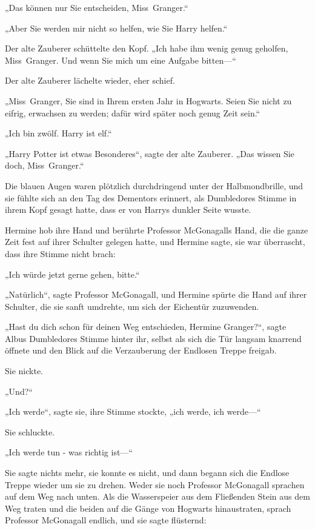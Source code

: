 {„Das können nur Sie entscheiden, Miss~Granger.“

„Aber Sie werden mir nicht so helfen, wie Sie Harry helfen.“

Der alte Zauberer schüttelte den Kopf. „Ich habe ihm wenig genug geholfen, Miss~Granger. Und wenn Sie mich um eine Aufgabe bitten—“

Der alte Zauberer lächelte wieder, eher schief.

„Miss~Granger, Sie sind in Ihrem ersten Jahr in Hogwarts. Seien Sie nicht zu eifrig, erwachsen zu werden; dafür wird später noch genug Zeit sein.“

„Ich bin zwölf. Harry ist elf.“

„Harry Potter ist etwas Besonderes“, sagte der alte Zauberer. „Das wissen Sie doch, Miss~Granger.“

Die blauen Augen waren plötzlich durchdringend unter der Halbmondbrille, und sie fühlte sich an den Tag des Dementors erinnert, als Dumbledores Stimme in ihrem Kopf gesagt hatte, dass er von Harrys dunkler Seite wusste.

Hermine hob ihre Hand und berührte Professor McGonagalls Hand, die die ganze Zeit fest auf ihrer Schulter gelegen hatte, und Hermine sagte, sie war überrascht, dass ihre Stimme nicht brach:

„Ich würde jetzt gerne gehen, bitte.“

„Natürlich“, sagte Professor McGonagall, und Hermine spürte die Hand auf ihrer Schulter, die sie sanft umdrehte, um sich der Eichentür zuzuwenden.

„Hast du dich schon für deinen Weg entschieden, Hermine Granger?“, sagte Albus Dumbledores Stimme hinter ihr, selbst als sich die Tür langsam knarrend öffnete und den Blick auf die Verzauberung der Endlosen Treppe freigab.

Sie nickte.

„Und?“

„Ich werde“, sagte sie, ihre Stimme stockte, „ich werde, ich werde—“

Sie schluckte.

„Ich werde tun - was richtig ist—“

Sie sagte nichts mehr, sie konnte es nicht, und dann begann sich die Endlose Treppe wieder um sie zu drehen. Weder sie noch Professor McGonagall sprachen auf dem Weg nach unten. Als die Wasserspeier aus dem Fließenden Stein aus dem Weg traten und die beiden auf die Gänge von Hogwarts hinaustraten, sprach Professor McGonagall endlich, und sie sagte flüsternd:

}

